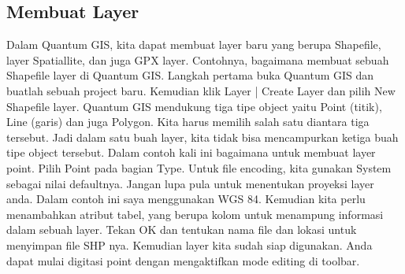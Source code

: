 \subsection{Membuat Layer}
    Dalam Quantum GIS, kita dapat membuat layer baru yang berupa Shapefile, layer Spatiallite, dan juga GPX layer. Contohnya, bagaimana membuat sebuah Shapefile layer di Quantum GIS. 
    Langkah pertama buka Quantum GIS dan buatlah sebuah project baru. Kemudian klik Layer | Create Layer dan pilih New Shapefile layer. Quantum GIS mendukung  tiga tipe object yaitu Point (titik), Line (garis) dan juga Polygon. Kita harus memilih salah satu diantara tiga tersebut. Jadi dalam satu buah layer, kita tidak bisa mencampurkan ketiga buah tipe object tersebut. Dalam contoh kali ini bagaimana untuk membuat layer point. Pilih Point pada bagian Type. Untuk file encoding, kita gunakan System sebagai nilai defaultnya. Jangan lupa pula untuk menentukan proyeksi layer anda. Dalam contoh ini saya menggunakan WGS 84.  
    Kemudian kita perlu menambahkan atribut tabel, yang berupa kolom untuk menampung informasi dalam sebuah layer.
    Tekan OK dan tentukan nama file dan lokasi untuk menyimpan file SHP nya. Kemudian layer kita sudah siap digunakan. Anda dapat mulai digitasi point dengan mengaktifkan mode editing di toolbar. 
